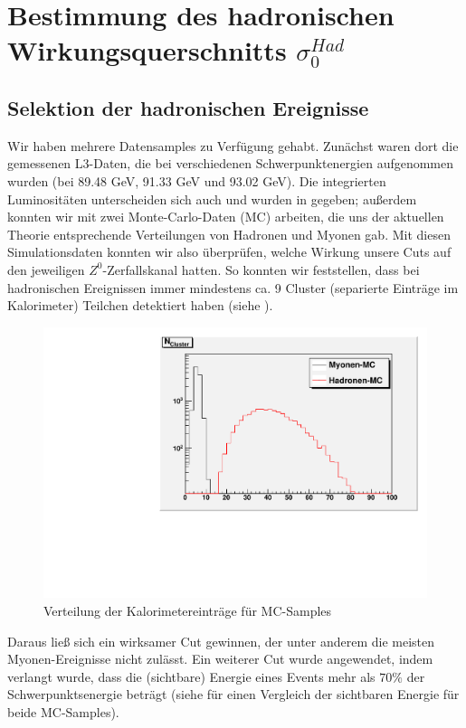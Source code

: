 \section{Bestimmung des hadronischen Wirkungsquerschnitts $\sigma_0^{Had}$}
\subsection{Selektion der hadronischen Ereignisse}
Wir haben mehrere Datensamples zu Verfügung gehabt. Zunächst waren dort die gemessenen L3-Daten, die bei verschiedenen Schwerpunktenergien aufgenommen wurden (bei 89.48 GeV, 91.33 GeV und 93.02 GeV). Die integrierten Luminositäten unterscheiden sich auch und wurden in \cite[S.9]{script} gegeben; außerdem konnten wir mit zwei Monte-Carlo-Daten (MC) arbeiten, die uns der aktuellen Theorie entsprechende Verteilungen von Hadronen und Myonen gab. Mit diesen Simulationsdaten konnten wir also überprüfen, welche Wirkung unsere Cuts auf den jeweiligen $Z^0$-Zerfallskanal hatten. So konnten wir feststellen, dass bei hadronischen Ereignissen immer mindestens ca. 9 Cluster (separierte Einträge im Kalorimeter) Teilchen detektiert haben (siehe ).
\begin{figure}[htb]
	\centering
	\includegraphics[width=1\columnwidth,keepaspectratio]{Ncluster_vgl.pdf}
	\caption{Verteilung der Kalorimetereinträge für MC-Samples}
	\label{fig:Ncluster_vgl}
\end{figure}
Daraus ließ sich ein wirksamer Cut gewinnen, der unter anderem die meisten Myonen-Ereignisse nicht zulässt. Ein weiterer Cut wurde angewendet, indem verlangt wurde, dass die (sichtbare) Energie eines Events mehr als $70\%$ der Schwerpunktsenergie beträgt (siehe  für einen Vergleich der sichtbaren Energie für beide MC-Samples).
